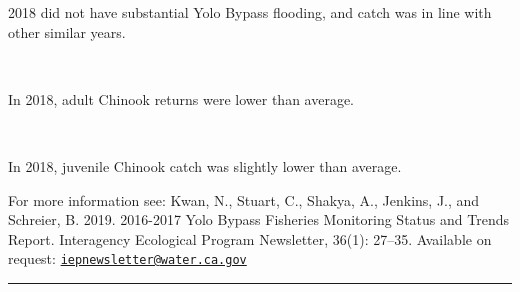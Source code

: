 \documentclass[
]{book}
\begin{document}
\begin{panel-grid}
\begin{columns-nocenter}
\begin{column800}
\begin{expand}
\end{expand}

\end{column800}

\end{columns-nocenter}

\begin{columns-nocenter}

\begin{column800}

2018 did not have substantial Yolo Bypass flooding, and catch was in line with other similar years.

\end{column800}

\begin{column40}

~

\end{column40}

\begin{column800}

In 2018, adult Chinook returns were lower than average.

\end{column800}

\begin{column40}

~

\end{column40}

\begin{column800}

In 2018, juvenile Chinook catch was slightly lower than average.

\end{column800}

\end{columns-nocenter}

\end{panel-grid}

\begin{disclaimer}
For more information see: Kwan, N., Stuart, C., Shakya, A., Jenkins, J.,
and Schreier, B. 2019. 2016-2017 Yolo Bypass Fisheries Monitoring Status
and Trends Report. Interagency Ecological Program Newsletter, 36(1):
27--35. Available on request:
\href{mailto:iepnewsletter@water.ca.gov}{\nolinkurl{iepnewsletter@water.ca.gov}}
\end{disclaimer}

\begin{center}\rule{0.5\linewidth}{0.5pt}\end{center}
\end{document}
